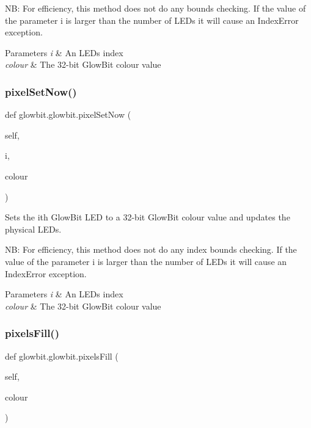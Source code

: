 NB\+: For efficiency, this method does not do any bounds checking. If the value of the parameter i is larger than the number of L\+E\+Ds it will cause an Index\+Error exception.


\begin{DoxyParams}{Parameters}
{\em i} & An L\+ED\textquotesingle{}s index \\
\hline
{\em colour} & The 32-\/bit Glow\+Bit colour value \\
\hline
\end{DoxyParams}
\mbox{\label{classglowbit_1_1glowbit_a6f4167e566106d5eb104933b256f2e14}} 
\subsubsection{\texorpdfstring{pixel\+Set\+Now()}{pixelSetNow()}}
{\footnotesize\ttfamily def glowbit.\+glowbit.\+pixel\+Set\+Now (\begin{DoxyParamCaption}\item[{}]{self,  }\item[{}]{i,  }\item[{}]{colour }\end{DoxyParamCaption})}



Sets the i\textquotesingle{}th Glow\+Bit L\+ED to a 32-\/bit Glow\+Bit colour value and updates the physical L\+E\+Ds. 

NB\+: For efficiency, this method does not do any index bounds checking. If the value of the parameter i is larger than the number of L\+E\+Ds it will cause an Index\+Error exception.


\begin{DoxyParams}{Parameters}
{\em i} & An L\+ED\textquotesingle{}s index \\
\hline
{\em colour} & The 32-\/bit Glow\+Bit colour value \\
\hline
\end{DoxyParams}
\mbox{\label{classglowbit_1_1glowbit_aca86823fecc4949692ac18f8c21e34ac}} 
\subsubsection{\texorpdfstring{pixels\+Fill()}{pixelsFill()}}
{\footnotesize\ttfamily def glowbit.\+glowbit.\+pixels\+Fill (\begin{DoxyParamCaption}\item[{}]{self,  }\item[{}]{colour }\end{DoxyParamCaption})}



